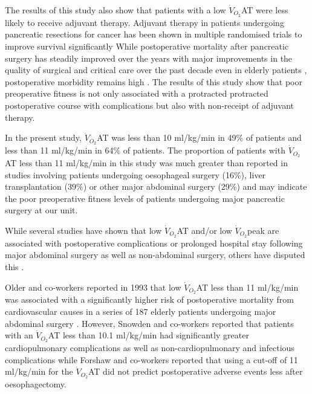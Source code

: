 The results of this study also show that patients with a low $\dot{V}_{O_2}$AT were less likely to receive adjuvant therapy. 
Adjuvant therapy in patients undergoing pancreatic resections for cancer has been shown in multiple randomised trials to improve survival significantly \parencite{neoptolemos_randomized_2004, neoptolemos_adjuvant_2009}
While postoperative mortality after pancreatic surgery has steadily improved over the years with major improvements in the quality of surgical and critical care over the past decade \parencite{winter_1423_2006} even in elderly patients \parencite{makary_pancreaticoduodenectomy_2006}, postoperative morbidity remains high \parencite{mann_review_2010}. 
The results of this study show that poor preoperative fitness is not only associated with a protracted protracted postoperative course with complications but also with non-receipt of adjuvant therapy.

In the present study, $\dot{V}_{O_2}$AT was less than 10 ml/kg/min in 49\% of patients and less than 11 ml/kg/min in 64\% of patients. 
The proportion of patients with $\dot{V}_{O_2}$AT less than 11 ml/kg/min in this study was much greater than reported in studies involving patients undergoing oesophageal surgery (16\%),\parencite{forshaw_is_2008} liver transplantation (39\%)\parencite{epstein_aerobic_2004} or other major abdominal surgery (29\%)\parencite{older_preoperative_1993} and may indicate the poor preoperative fitness levels of patients undergoing major pancreatic surgery at our unit. 

While several studies have shown that low $\dot{V}_{O_2}$AT and/or low $\dot{V}_{O_2}$peak are associated with postoperative complications or prolonged hospital stay following major abdominal surgery as well as non-abdominal surgery,\parencite{older_preoperative_1993, epstein_aerobic_2004, mccullough_cardiorespiratory_2006, nagamatsu_preoperative_2001, older_cardiopulmonary_1999, older_clinical_2004} others have disputed this \parencite{forshaw_is_2008, clayton_cardiopulmonary_2011, hightower_pilot_2010}. 

Older and co-workers reported in 1993 that low $\dot{V}_{O_2}$AT less than 11 ml/kg/min was associated with a significantly higher risk of postoperative mortality from cardiovascular causes in a series of 187 elderly patients undergoing major abdominal surgery \parencite{older_preoperative_1993}.
However, Snowden and co-workers \parencite{snowden_submaximal_2010} reported that patients with an $\dot{V}_{O_2}$AT less than 10.1 ml/kg/min had significantly greater cardiopulmonary complications as well as non-cardiopulmonary and infectious complications while Forshaw and co-workers \parencite{forshaw_is_2008} reported that using a cut-off of 11 ml/kg/min for the $\dot{V}_{O_2}$AT did not predict postoperative adverse events less after oesophagectomy. 

